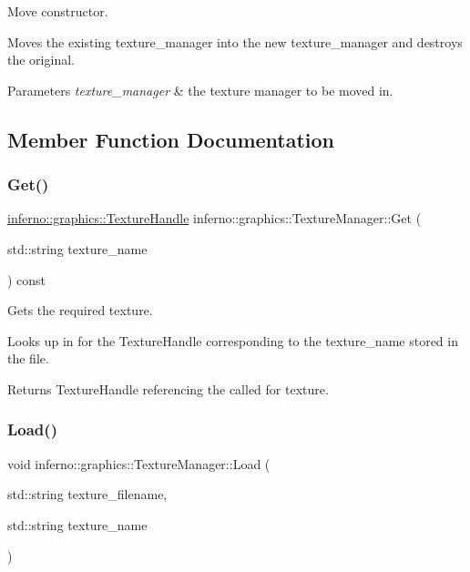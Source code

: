 Move constructor. 

Moves the existing texture\+\_\+manager into the new texture\+\_\+manager and destroys the original. 
\begin{DoxyParams}{Parameters}
{\em texture\+\_\+manager} & the texture manager to be moved in. \\
\hline
\end{DoxyParams}


\subsection{Member Function Documentation}
\mbox{\label{classinferno_1_1graphics_1_1_texture_manager_ae2b18c9725addce31e35034ea6642fbf}} 
\subsubsection{\texorpdfstring{Get()}{Get()}}
{\footnotesize\ttfamily \mbox{\hyperlink{namespaceinferno_1_1graphics_a9d719bfbfedd17b9ace9b8d603ab5a38}{inferno\+::graphics\+::\+Texture\+Handle}} inferno\+::graphics\+::\+Texture\+Manager\+::\+Get (\begin{DoxyParamCaption}\item[{std\+::string}]{texture\+\_\+name }\end{DoxyParamCaption}) const}



Gets the required texture. 

Looks up in for the Texture\+Handle corresponding to the texture\+\_\+name stored in the file. \begin{DoxyReturn}{Returns}
Texture\+Handle referencing the called for texture. 
\end{DoxyReturn}
\mbox{\label{classinferno_1_1graphics_1_1_texture_manager_aa8a3d242633cc83fd3fe178520d15cb6}} 
\subsubsection{\texorpdfstring{Load()}{Load()}}
{\footnotesize\ttfamily void inferno\+::graphics\+::\+Texture\+Manager\+::\+Load (\begin{DoxyParamCaption}\item[{std\+::string}]{texture\+\_\+filename,  }\item[{std\+::string}]{texture\+\_\+name }\end{DoxyParamCaption})}



